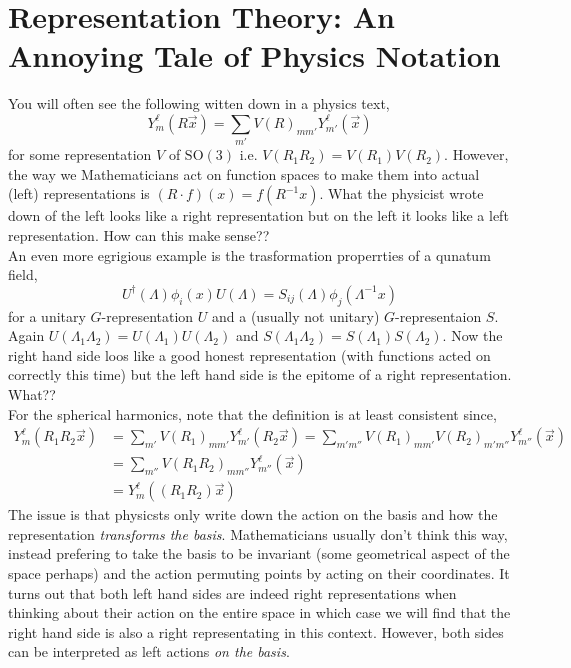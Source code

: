 \documentclass[12pt]{extarticle}
\theoremstyle{definition}
\newcommand{\SO}[1]{\mathrm{SO}\left(#1\right)}
\begin{document}
\newpage

\section{Representation Theory: An Annoying Tale of Physics Notation}

You will often see the following witten down in a physics text,
\[ Y^\ell_m(R \vec{x}) = \sum_{m'} V(R)_{m m'} Y^{\ell}_{m'}(\vec{x}) \]
for some representation $V$ of $\SO{3}$ i.e. $V(R_1 R_2) = V(R_1) V(R_2)$. However, the way we Mathematicians act on function spaces to make them into actual (left) representations is $(R \cdot f)(x) = f(R^{-1} x)$. What the physicist wrote down of the left looks like a right representation but on the left it looks like a left representation. How can this make sense??
\bigskip\\
An even more egrigious example is the trasformation properrties of a qunatum field,
\[ U^\dagger(\Lambda) \phi_i(x) U(\Lambda) = S_{ij}(\Lambda) \phi_{j}(\Lambda^{-1} x) \]
for a unitary $G$-representation $U$ and a (usually not unitary) $G$-representaion $S$. Again $U(\Lambda_1 \Lambda_2) = U(\Lambda_1) U(\Lambda_2)$ and $S(\Lambda_1 \Lambda_2) = S(\Lambda_1) S(\Lambda_2)$. 
Now the right hand side loos like a good honest representation (with functions acted on correctly this time) but the left hand side is the epitome of a right representation. What??
\bigskip\\
For the spherical harmonics, note that the definition is at least consistent since,
\begin{align*}
Y^\ell_m(R_1 R_2 \vec{x}) & = \sum_{m'} V(R_1)_{m m'} Y^\ell_{m'}(R_2 \vec{x}) = \sum_{m' m''} V(R_1)_{m m'} V(R_2)_{m' m''} Y^\ell_{m''}(\vec{x}) 
\\
& = \sum_{m''} V(R_1 R_2)_{m m''} Y^\ell_{m''}(\vec{x})
\\
& = Y^\ell_m((R_1 R_2) \vec{x})
\end{align*}
The issue is that physicsts only write down the action on the basis and how the representation \textit{transforms the basis}. Mathematicians usually don't think this way, instead prefering to take the basis to be invariant (some geometrical aspect of the space perhaps) and the action permuting points by acting on their coordinates. It turns out that both left hand sides are indeed right representations when thinking about their action on the entire space in which case we will find that the right hand side is also a right representating in this context. However, both sides can be interpreted as left actions \textit{on the basis}. 
\end{document}
